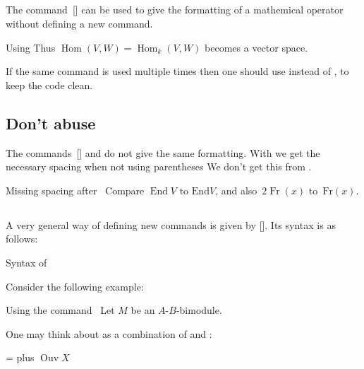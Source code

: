 \subsection{}

The command~[\comname] can be used to give the formatting of a mathemical operator without defining a new command.
\begin{showlatex}{Using }
Thus $\operatorname{Hom}(V,W) = \operatorname{Hom}_k(V,W)$ becomes a vector space.
\end{showlatex}
If the same command is used multiple times then one should use  instead of , to keep the code clean.



\subsection{Don’t abuse }

The commands~[\comname] and  do not give the same formatting.
With  we get the necessary spacing when not using parentheses
We don’t get this from .
\begin{showlatex}{Missing spacing after~}
Compare $\operatorname{End} V$ to $\mathrm{End} V$, and also~$2 \operatorname{Fr}(x)$ to~$\mathrm{Fr}(x)$.
\end{showlatex}



\subsection{}

A very general way of defining new commands is given by [\comname].
Its syntax is as follows:
\begin{showcode}{Syntax of }
\newcommand{\name}[number of arguments n]{ definition including #1, ..., #n }
\end{showcode}
Consider the following example:
\begin{showlatex}{Using the command~}
\newcommand{\bimodule}[2]{#1-#2-bimodule}
Let $M$ be an \bimodule{$A$}{$B$}.
\end{showlatex}
One may think about  as a combination of  and :
\begin{showlatex}{ =  plus }
\newcommand{\Ouv}{\operatorname{Ouv}}
$\Ouv X$
\end{showlatex}

